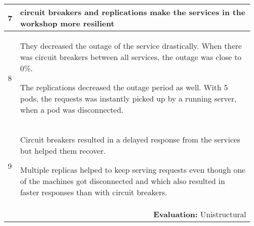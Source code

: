 \begin{longtable}{|p{0.3cm}|p{14.7cm}|}
7 & circuit breakers and replications make the services in the workshop more resilient \\ \hline

8 & They decreased the outage of the service drastically. When there was circuit breakers between all services, the outage was close to 0\%.

\noindent The replications decreased the outage period as well. With 5 pods, the requests was instantly picked up by a running server, when a pod was disconnected. \\ \hline

9 & Circuit breakers resulted in a delayed response from the services but helped them recover. 


\noindent Multiple replicas helped to keep serving requests even though one of the machines got disconnected and which also resulted in faster responses than with circuit breakers.\\ \hline

\multicolumn{2}{r}{\textbf{Evaluation:} Unistructural} \\ 
\end{longtable}
\normalsize


